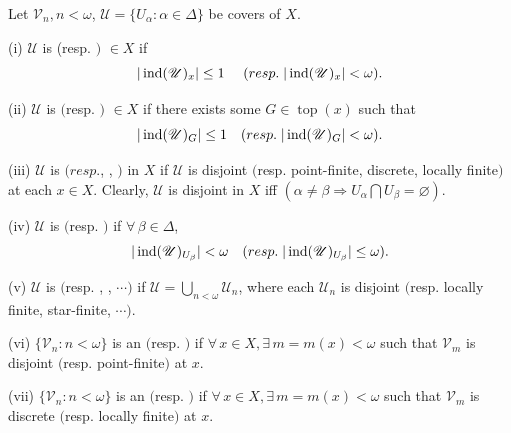 \documentclass[main.tex]{subfiles}
\begin{document}
{ \label{def:1.1.3} Let  $\mathscr{V}_n, n<\omega$,  
	$\mathscr{U}=\{ U_\alpha: \alpha \in \Delta\}$ be covers of  $X$.
	
\textup{(i)}  $ \mathscr{U}$ is  
	\textup{(}resp. $)$
	 $\in X$ if 
$$|\operatorname{ind}(\mathscr{U})_x|\leq 1 \quad
	\textup{ (}resp. \; |\operatorname{ind}(\mathscr{U})_x| < \omega).$$
	
\textup{(ii)} $\mathscr{U}$ is  
	$($resp. $)$ 
	 $\in X$
	if there exists some $G\in\operatorname{top}(x)$ such that
$$|\operatorname{ind}(\mathscr{U})_G| \leq 1 \quad
	\textup{(}resp. \; |\operatorname{ind}(\mathscr{U})_G|  < \omega).$$
	
\textup{(iii)} $\mathscr{U}$ is  
	$(resp. $,
	, 
	$)$ in $X$
	if $\mathscr{U}$ is  
	disjoint $($resp. point-finite, discrete, locally finite$)$ at each $x\in X$.
	Clearly, $\mathscr{U}$ is disjoint in  $X$ iff  
	$(\alpha \neq \beta \Rightarrow  
	U_\alpha\bigcap U_\beta= \varnothing).$
	
\textup{(iv)}  $\mathscr{U}$  is 
	$($resp. $)$ if
	$\forall \, \beta\in\Delta$,
$$|\operatorname{ind}(
	\mathscr{U})_{U_{\beta}}| < \omega  \quad
	\textup{(}resp. \;  |\operatorname{ind}(\mathscr{U})_{U_{\beta}}| \le\omega).$$
	
\textup{(v)}  $\mathscr{U}$  is 
	$($resp. , 
	, $\cdots)$ if
	$\mathscr{U} = \bigcup_{n < \omega}\mathscr{U}_n$,
	where each $\mathscr{U}_n$ is disjoint $($resp. locally finite, star-finite, $\cdots)$.
	
\textup{(vi)}  $\{\mathscr{V}_n: n <\omega\}$  is an 
	$($resp. $)$
	if $\forall \, x \in X, \exists \, m = m(x) < \omega$ such that 
	$\mathscr{V}_m$ is disjoint $($resp. point-finite$)$ at $x$.
	
\textup{(vii)}  $\{\mathscr{V}_n: n<\omega\}$  is an 
	$($resp. $)$
	if $\forall \, x \in X, \exists \, m = m(x)  < \omega$ such that 
	$\mathscr{V}_m$ is discrete $($resp. locally finite$)$ at $x$.
} %
\end{document}
